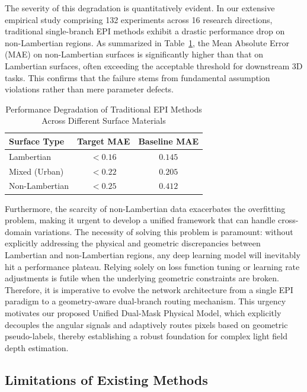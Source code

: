 \documentclass[lettersize,journal]{IEEEtran}
\begin{document}
The severity of this degradation is quantitatively evident. In our extensive empirical study comprising 132 experiments across 16 research directions, traditional single-branch EPI methods exhibit a drastic performance drop on non-Lambertian regions. As summarized in Table~\ref{tab:mae_degradation}, the Mean Absolute Error (MAE) on non-Lambertian surfaces is significantly higher than that on Lambertian surfaces, often exceeding the acceptable threshold for downstream 3D tasks. This confirms that the failure stems from fundamental assumption violations rather than mere parameter defects.

\begin{table}[!t]
\centering
\caption{Performance Degradation of Traditional EPI Methods Across Different Surface Materials}
\label{tab:mae_degradation}
\begin{tabular}{lcc}
\toprule
\textbf{Surface Type} & \textbf{Target MAE} & \textbf{Baseline MAE} \\
\midrule
Lambertian & $< 0.16$ & $0.145$ \\
Mixed (Urban) & $< 0.22$ & $0.205$ \\
Non-Lambertian & $< 0.25$ & $0.412$ \\
\bottomrule
\end{tabular}
\end{table}

Furthermore, the scarcity of non-Lambertian data exacerbates the overfitting problem, making it urgent to develop a unified framework that can handle cross-domain variations. The necessity of solving this problem is paramount: without explicitly addressing the physical and geometric discrepancies between Lambertian and non-Lambertian regions, any deep learning model will inevitably hit a performance plateau. Relying solely on loss function tuning or learning rate adjustments is futile when the underlying geometric constraints are broken. Therefore, it is imperative to evolve the network architecture from a single EPI paradigm to a geometry-aware dual-branch routing mechanism. This urgency motivates our proposed Unified Dual-Mask Physical Model, which explicitly decouples the angular signals and adaptively routes pixels based on geometric pseudo-labels, thereby establishing a robust foundation for complex light field depth estimation.

\subsection{Limitations of Existing Methods}
\end{document}
